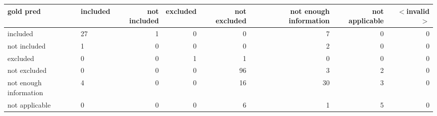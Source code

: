\begin{tabular}{llrrrrrr}
\toprule
gold  pred & included & not included & excluded & not excluded & not enough information & not applicable & $<$invalid$>$ \\
\midrule
included & 27 & 1 & 0 & 0 & 7 & 0 & 0 \\
not included & 1 & 0 & 0 & 0 & 2 & 0 & 0 \\
excluded & 0 & 0 & 1 & 1 & 0 & 0 & 0 \\
not excluded & 0 & 0 & 0 & 96 & 3 & 2 & 0 \\
not enough information & 4 & 0 & 0 & 16 & 30 & 3 & 0 \\
not applicable & 0 & 0 & 0 & 6 & 1 & 5 & 0 \\
\bottomrule
\end{tabular}
